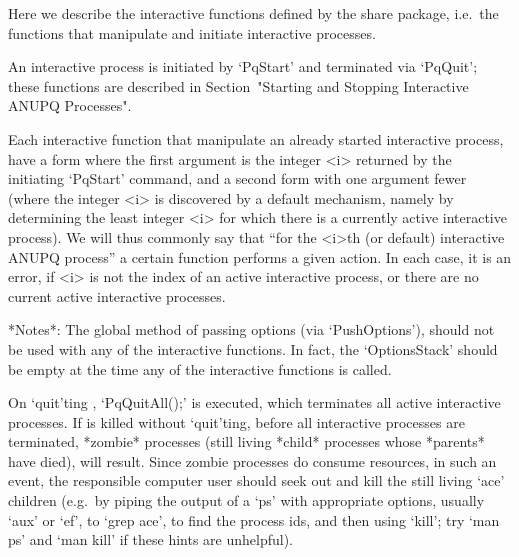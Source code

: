 

Here we describe the interactive functions defined by the {\ANUPQ}  share
package, i.e.~the functions  that  manipulate  and  initiate  interactive
{\ANUPQ} processes.

An  interactive  {\ANUPQ}  process  is  initiated  by   `PqStart'   and
terminated  via  `PqQuit';   these   functions   are   described   in
Section~"Starting and Stopping Interactive ANUPQ Processes".

Each interactive {\ANUPQ} function that  manipulate  an  already  started
interactive {\ANUPQ} process, have a form where the first argument is the
integer <i> returned by the initiating `PqStart' command,  and  a  second
form with one argument fewer (where the integer <i> is  discovered  by  a
default mechanism, namely by determining the least integer <i> for  which
there is a currently active interactive {\ANUPQ} process). We  will  thus
commonly say that  ``for  the  <i>th  (or  default)  interactive  {ANUPQ}
process'' a certain function performs a given action. In each case, it is
an error, if <i> is not the index of an active  interactive  process,  or
there are no current active interactive processes.

*Notes*: 
The global method of passing options (via `PushOptions'), should  not  be
used with any of the interactive functions. In fact,  the  `OptionsStack'
should be empty at the time any of the interactive functions is called.

On `quit'ting {\GAP}, `PqQuitAll();' is executed,  which  terminates  all
active interactive  {\ANUPQ}  processes.  If  {\GAP}  is  killed  without
`quit'ting, before all interactive  {\ANUPQ}  processes  are  terminated,
*zombie* processes (still living *child* processes whose  *parents*  have
died), will result. Since zombie processes do consume resources, in  such
an event, the responsible computer user should  seek  out  and  kill  the
still living `ace' children (e.g.~by piping the output  of  a  `ps'  with
appropriate options, usually `aux' or `ef', to `grep ace',  to  find  the
process ids, and then using `kill'; try `man ps' and `man kill' if  these
hints are unhelpful).

